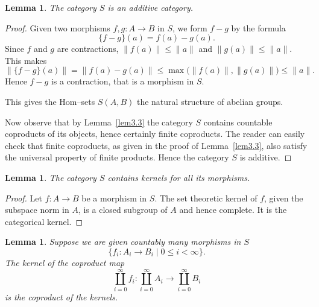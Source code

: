 \documentclass[11pt,a4paper]{article}
\theoremstyle{plain}
\newtheorem{lemma}[theorem]{Lemma}
\theoremstyle{definition}
\numberwithin{equation}{section}
\begin{document}
\begin{lemma}\label{lem3.4}
The category $S$ is an additive category.
\end{lemma}

\begin{proof}
Given two morphisms $f, g: A \to B$ in $S$, we form $f-g$ by the formula
\begin{equation*}
\{f-g\}(a) = f(a) - g(a).
\end{equation*}
Since $f$ and $g$ are contractions, $\|f(a)\| \leq \|a\|$ and $\|g(a)\| \leq \|a\|$. This makes
\begin{equation*}
\|\{f-g\}(a)\| = \|f(a)-g(a)\| \leq \max\bigl(\|f(a)\|,\|g(a)\|\bigr) \leq \|a\|.
\end{equation*}
Hence $f-g$ is a contraction, that is a morphism in $S$.

This gives the Hom--sets $S(A,B)$ the natural structure of abelian groups.

Now observe that by Lemma~\ref{lem3.3} the category $S$ contains countable coproducts of its objects, hence certainly finite coproducts. The reader can easily check that finite coproducts, as given in the proof of Lemma~\ref{lem3.3}, also satisfy the universal property of finite products. Hence the category $S$ is additive.
\end{proof}

\begin{lemma}\label{lem3.5}
The category $S$ contains kernels for all its morphisms.
\end{lemma}

\begin{proof}
Let $f: A \to B$ be a morphism in $S$. The set theoretic kernel of $f$, given the subspace norm in $A$, is a closed subgroup of $A$ and hence complete. It is the categorical kernel.
\end{proof}

\begin{lemma}\label{lem3.6}
Suppose we are given countably many morphisms in $S$
\begin{equation*}
\{f_{i}: A_{i} \to B_{i} \mid 0 \leq i < \infty\}.
\end{equation*}
The kernel of the coproduct map
\begin{equation*}
\coprod_{i=0}^{\infty} f_{i}: \coprod_{i=0}^{\infty} A_{i} \longrightarrow \coprod_{i=0}^{\infty} B_{i}
\end{equation*}
is the coproduct of the kernels.
\end{lemma}
\end{document}

